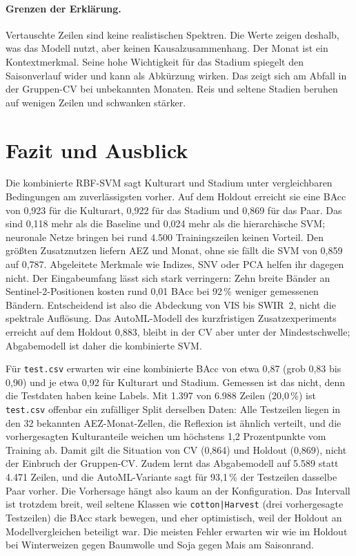 \documentclass[11pt,a4paper,titlepage]{article}
\begin{document}
\paragraph{Grenzen der Erkl\"arung.}
Vertauschte Zeilen sind keine realistischen Spektren. Die Werte zeigen
deshalb, was das Modell nutzt, aber keinen Kausalzusammenhang. Der Monat ist
ein Kontextmerkmal. Seine hohe Wichtigkeit f\"ur das Stadium spiegelt den
Saisonverlauf wider und kann als Abk\"urzung wirken. Das zeigt sich am Abfall
in der Gruppen-CV bei unbekannten Monaten. Reis und seltene Stadien beruhen
auf wenigen Zeilen und schwanken st\"arker.

\section{Fazit und Ausblick}
\label{sec:fazit}

Die kombinierte RBF-SVM sagt Kulturart und Stadium unter vergleichbaren
Bedingungen am zuverl\"assigsten vorher. Auf dem Holdout erreicht sie eine BAcc
von 0,923 f\"ur die Kulturart, 0,922 f\"ur das Stadium und 0,869 f\"ur das Paar.
Das sind 0,118 mehr als die Baseline und 0,024 mehr als die hierarchische SVM;
neuronale Netze bringen bei rund 4.500 Trainingszeilen keinen Vorteil. Den
gr\"o\ss{}ten Zusatznutzen liefern AEZ und Monat, ohne sie f\"allt die SVM von 0,859
auf 0,787. Abgeleitete Merkmale wie Indizes, SNV oder PCA helfen ihr dagegen
nicht. Der Eingabeumfang l\"asst sich stark verringern: Zehn breite B\"ander an
Sentinel-2-Positionen kosten rund 0,01 BAcc bei 92\,\% weniger gemessenen
B\"andern. Entscheidend ist also die Abdeckung von VIS bis SWIR~2, nicht die
spektrale Aufl\"osung. Das AutoML-Modell des kurzfristigen Zusatzexperiments
erreicht auf dem Holdout 0,883, bleibt
in der CV aber unter der Mindestschwelle;
Abgabemodell ist daher die kombinierte SVM.

F\"ur \texttt{test.csv} erwarten wir eine kombinierte BAcc von etwa 0,87
(grob 0,83 bis 0,90) und je etwa 0,92 f\"ur Kulturart und Stadium. Gemessen ist
das nicht, denn die Testdaten haben keine Labels. Mit 1.397 von 6.988 Zeilen
(20,0\,\%) ist \texttt{test.csv} offenbar ein zuf\"alliger Split derselben Daten:
Alle Testzeilen liegen in den 32 bekannten AEZ-Monat-Zellen, die Reflexion ist
\"ahnlich verteilt, und die vorhergesagten Kulturanteile weichen um h\"ochstens
1,2 Prozentpunkte vom Training ab. Damit gilt die Situation von CV (0,864) und
Holdout (0,869), nicht der Einbruch der Gruppen-CV. Zudem lernt das
Abgabemodell auf 5.589 statt 4.471 Zeilen, und die AutoML-Variante sagt f\"ur
93,1\,\% der Testzeilen dasselbe Paar vorher. Die Vorhersage h\"angt also kaum an
der Konfiguration. Das Intervall ist trotzdem breit, weil seltene Klassen wie
\texttt{cotton|Harvest} (drei vorhergesagte Testzeilen) die BAcc stark bewegen,
und eher optimistisch, weil der Holdout an Modellvergleichen beteiligt war.
Die meisten Fehler erwarten wir wie im Holdout bei Winterweizen gegen Baumwolle
und Soja gegen Mais am Saisonrand.
\end{document}
